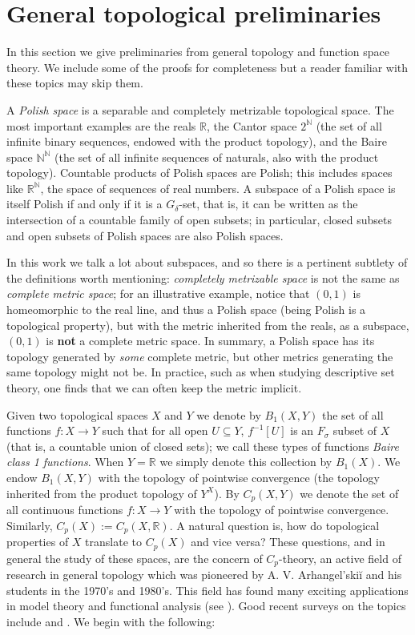 \documentclass[psamsfonts]{amsart}
\theoremstyle{definition}
\theoremstyle{remark}
\numberwithin{equation}{section}
\begin{document}
\section{General topological preliminaries}\label{sec:prelim}

In this section we give preliminaries from general topology and function space theory. We include some of the proofs for completeness but a reader familiar with these topics may skip them.

A \emph{Polish space} is a separable and completely metrizable topological space. The most important examples are the reals $\mathbb R$, the Cantor space $2^\mathbb N$ (the set of all infinite binary sequences, endowed with the product topology), and the Baire space $\mathbb N^\mathbb N$ (the set of all infinite sequences of naturals, also with the product topology). Countable products of Polish spaces are Polish; this includes spaces like $\mathbb R^\mathbb N$, the space of sequences of real numbers. A subspace of a Polish space is itself Polish if and only if it is a $G_\delta$-set, that is, it can be written as the intersection of a countable family of open subsets; in particular, closed subsets and open subsets of Polish spaces are also Polish spaces.

In this work we talk a lot about subspaces, and so there is a pertinent subtlety of the definitions worth mentioning: \emph{completely metrizable space} is not the same as \emph{complete metric space}; for an illustrative example, notice that $(0,1)$ is homeomorphic to the real line, and thus a Polish space (being Polish is a topological property), but with the metric inherited from the reals, as a subspace, $(0,1)$ is \textbf{not} a complete metric space. In summary, a Polish space has its topology generated by \emph{some} complete metric, but other metrics generating the same topology might not be. In practice, such as when studying descriptive set theory, one finds that we can often keep the metric implicit.

Given two topological spaces $X$ and $Y$ we denote by $B_1(X,Y)$ the set of all functions $f:X\to Y$ such that for all open $U\subseteq Y$, $f^{-1}[U]$ is an $F_\sigma$ subset of $X$ (that is, a countable union of closed sets); we call these types of functions \emph{Baire class 1 functions}. When $Y=\mathbb{R}$ we simply denote this collection by $B_1(X)$. We endow $B_1(X,Y)$ with the topology of pointwise convergence (the topology inherited from the product topology of $Y^X$). By $C_p(X,Y)$ we denote the set of all continuous functions $f:X\rightarrow Y$ with the topology of pointwise convergence. Similarly, $C_p(X):=C_p(X,\mathbb{R})$. A natural question is, how do topological properties of $X$ translate to $C_p(X)$ and vice versa? These questions, and in general the study of these spaces, are the concern of $C_p$-theory, an active field of research in general topology which was pioneered by A. V. Arhangel’skiĭ and his students in the 1970's and 1980's. This field has found many exciting applications in model theory and functional analysis (see \cite{iovino2020banach}). Good recent surveys on the topics include \cite{hamel2023cp} and \cite{tkachuk2011cp}. We begin with the following:
\end{document}
